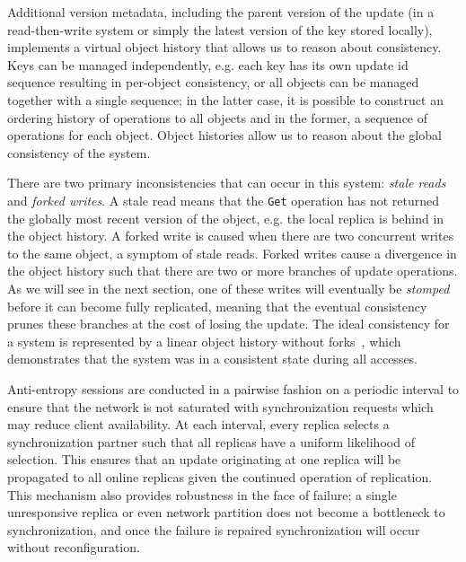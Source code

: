 Additional version metadata, including the parent version of the update (in a
read-then-write system or simply the latest version of the key stored
locally), implements a virtual object history that allows us to reason about
consistency.
Keys can be managed independently, e.g. each key has its own update id
sequence resulting in per-object consistency, or all objects can be managed
together with a single sequence; in the latter case, it is possible to
construct an ordering history of operations to all objects and in the former,
a sequence of operations for each object.
Object histories allow us to reason about the global consistency of the
system.

There are two primary inconsistencies that can occur in this system:
\textit{stale reads} and \textit{forked writes}.
A stale read means that the \texttt{Get} operation has not returned
the globally most recent version of the object, e.g. the local replica is
behind in the object history.
A forked write is caused when there are two concurrent writes to the same
object, a symptom of stale reads.
Forked writes cause a divergence in the object history such that there are
two or more branches of update operations.
As we will see in the next section, one of these writes will eventually be
\textit{stomped} before it can become fully replicated, meaning that the
eventual consistency prunes these branches at the cost of losing
the update.
The ideal consistency for a system is represented by a linear object history
without forks~\cite{rethinking_eventual}, which demonstrates that the
system was in a consistent state during all accesses.



Anti-entropy sessions are conducted in a pairwise fashion on a periodic
interval to ensure that the network is not saturated with synchronization
requests which may reduce client availability.
At each interval, every replica selects a synchronization partner such that
all replicas have a uniform likelihood of selection.
This ensures that an update originating at one replica will be propagated to
all online replicas given the continued operation of replication.
This mechanism also provides robustness in the face of failure; a single
unresponsive replica or even network partition does not become a bottleneck
to synchronization, and once the failure is repaired synchronization will
occur without reconfiguration.

